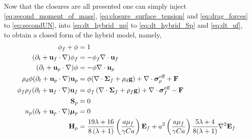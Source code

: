 Now that the closures are all presented one can simply inject \ref{eq:second_moment_of_mass}, \ref{eq:closure_surface_tension} and \ref{eq:drag_forces} to \ref{eq:secondUN}, into  \ref{eq:dt_hybrid_up} to \ref{eq:dt_hybrid_Sp} and \ref{eq:dt_uf}, to obtain a closed form of the hybrid model, namely,  
\begin{align}
    \label{eq:first}
    \phi_f + \phi &= 1\\
    (\pddt + \textbf{u}_f  \cdot \grad) \phi_f
    &= - \phi_f \div \textbf{u}_f\\
    (\pddt + \textbf{u}_p \cdot \grad)\phi
    &=
    - \phi \div \textbf{u}_p\\
    \rho_d \phi (\pddt + \textbf{u}_p \cdot \grad)\textbf{u}_p
    &=
    \phi(\div \bm\Sigma_f
    + \rho_d  \textbf{g})
    + \div \bm\sigma_p^\text{eff}
    + \textbf{F}
    \\
    \phi_f \rho_f(\pddt + \textbf{u}_f  \cdot \grad) \textbf{u}_f
    &= \phi_f 
    \left(\div \bm{\Sigma}_f
    + \rho_f \textbf{g}\right)
    + \div \bm\sigma_f^\text{eff}
    -\textbf{F}\\
    \textbf{S}_p &= 0\\
    n_p (\pddt + \textbf{u}_p \cdot \grad)\bm\mu_p &= 0\\
    \textbf{H}_p
    &=
    \frac{19 \lambda + 16}{8 \left(\lambda + 1\right)}
    \left(\frac{a \mu_f}{\gamma Ca}\right)
    \textbf{E}_f
    +
    a^2\left(\frac{a \mu_f}{\gamma Ca}\right)
    \frac{5\lambda+4}{8(\lambda+1)}\grad^2\textbf{E}_f
    \label{eq:last}
\end{align}
